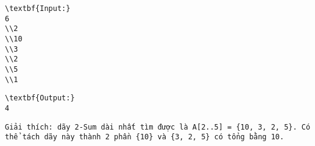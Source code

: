 \begin{verbatim}
\textbf{Input:}
6
\\2
\\10
\\3
\\2
\\5
\\1 \end{verbatim}
\begin{verbatim}
\textbf{Output:}
4\end{verbatim}
\begin{verbatim}
Giải thích: dãy 2-Sum dài nhất tìm được là A[2..5] = {10, 3, 2, 5}. Có thể tách dãy này thành 2 phần {10} và {3, 2, 5} có tổng bằng 10.\end{verbatim}